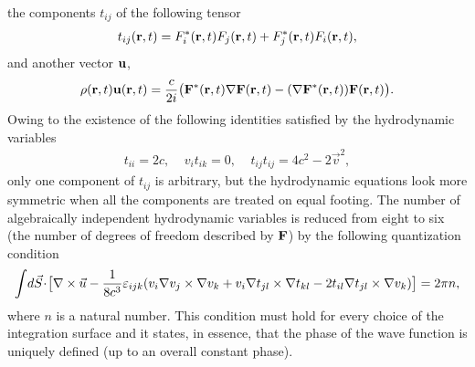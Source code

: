 \documentclass{article}
\begin{document}
the components $t_{ij}$ of the following tensor
\begin{eqnarray}
 t_{ij}({\bf r},t) = F^*_i({\bf r},t)F_j({\bf r},t)
 + F^*_j({\bf r},t)F_i({\bf r},t),
\end{eqnarray}
and another vector ${\bf u}$,
\begin{eqnarray}
 \rho({\bf r},t){\bf u}({\bf r},t)
 = \frac{c}{2i}\bigl({\bf F}^*({\bf r},t)\nabla{\bf F}({\bf r},t)
 -(\nabla{\bf F}^*({\bf r},t)){\bf F}({\bf r},t)\bigr).
\end{eqnarray}
Owing to the existence of the following identities satisfied by the
hydrodynamic variables
\begin{eqnarray}
  t_{ii} = 2c,\;\;\;\;
  v_i t_{ik} = 0,\;\;\;\;
  t_{ij} t_{ij} = 4c^2 - 2\vec v^2,
\end{eqnarray}
only one component of $t_{ij}$ is arbitrary, but the hydrodynamic
equations look more symmetric when all the components are treated on equal
footing. The number of algebraically independent hydrodynamic variables is
reduced from eight to six (the number of degrees of freedom described by
${\bf F}$) by the following quantization condition
\begin{equation}
\int\!d\vec S\!\cdot\!\bigl[\nabla\times\vec u
 - \frac{1}{8c^3}\varepsilon_{ijk}
  (v_i{\bf\nabla}v_j\times{\bf\nabla}v_k +
  v_i{\bf\nabla}t_{jl}\times{\bf\nabla}t_{kl} -
  2t_{il}{\bf\nabla}t_{jl}\times{\bf\nabla}v_k)\bigr] = 2\pi n,
\end{equation}
where $n$ is a natural number. This condition must hold for every choice of
the integration surface and it states, in essence, that the phase of the
wave function is uniquely defined (up to an overall constant phase).
\end{document}
